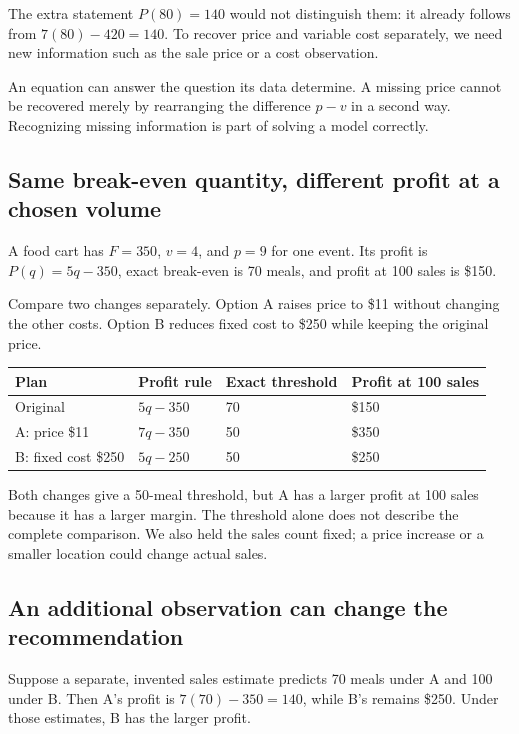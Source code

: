 \documentclass[11pt,letterpaper]{article}
\begin{document}
The extra statement $P(80)=140$ would not distinguish them: it already follows from $7(80)-420=140$. To recover price and variable cost separately, we need new information such as the sale price or a cost observation.

\begin{tcolorbox}[title={Information and assumptions}]
An equation can answer the question its data determine. A missing price cannot be recovered merely by rearranging the difference $p-v$ in a second way. Recognizing missing information is part of solving a model correctly.
\end{tcolorbox}

\clearpage
\subsection*{Same break-even quantity, different profit at a chosen volume}
A food cart has $F=350$, $v=4$, and $p=9$ for one event. Its profit is $P(q)=5q-350$, exact break-even is 70 meals, and profit at 100 sales is \$150.

Compare two changes separately. Option A raises price to \$11 without changing the other costs. Option B reduces fixed cost to \$250 while keeping the original price.

{\small\renewcommand{\arraystretch}{1.4}\begin{tabularx}{\linewidth}{@{}YYYY@{}}\toprule
Plan & Profit rule & Exact threshold & Profit at 100 sales\\\midrule
Original & $5q-350$ & 70 & \$150\\
A: price \$11 & $7q-350$ & 50 & \$350\\
B: fixed cost \$250 & $5q-250$ & 50 & \$250\\\bottomrule
\end{tabularx}}

Both changes give a 50-meal threshold, but A has a larger profit at 100 sales because it has a larger margin. The threshold alone does not describe the complete comparison. We also held the sales count fixed; a price increase or a smaller location could change actual sales.

\subsection*{An additional observation can change the recommendation}
Suppose a separate, invented sales estimate predicts 70 meals under A and 100 under B. Then A's profit is $7(70)-350=140$, while B's remains \$250. Under those estimates, B has the larger profit.
\end{document}
